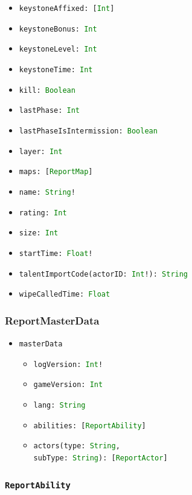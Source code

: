 \documentclass[10pt, a4paper]{memoir}
\numberwithin{equation}{section}
\theoremstyle{plain}
\theoremstyle{defp}
\theoremstyle{dotless}
\theoremstyle{definition}
\theoremstyle{dotless}
\theoremstyle{dotless}
\theoremstyle{defp}
\theoremstyle{defp}
\theoremstyle{be}          %
\theoremstyle{defp}
\newcommand\ttt[1]{\texttt{#1}}
\newcommand\type[1]{\ttt{\textcolor{green}{#1}}}
\begin{document}
\begin{itemize}[noitemsep, topsep=1pt]
\begin{itemize}[itemsep=1pt, topsep=1pt]
\item \ttt{keystoneAffixed: [\type{Int}]}
\item \ttt{keystoneBonus: \type{Int}}
\item \ttt{keystoneLevel: \type{Int}}
\item \ttt{keystoneTime: \type{Int}}
\item \ttt{kill: \type{Boolean}}
\item \ttt{lastPhase: \type{Int}}
\item \ttt{lastPhaseIsIntermission: \type{Boolean}}
\item \ttt{layer: \type{Int}}
\item \ttt{maps: [\type{ReportMap}]}
\item \ttt{name: \type{String}!}
\item \ttt{rating: \type{Int}}
\item \ttt{size: \type{Int}}
\item \ttt{startTime: \type{Float}!}
\item \ttt{talentImportCode(actorID: \type{Int}!): \type{String}}
\item \ttt{wipeCalledTime: \type{Float}}
\end{itemize}
\end{itemize}

\subsubsection{ReportMasterData}\label{sec:ReportMasterData}

\begin{itemize}[noitemsep,topsep=1pt]
\item \ttt{masterData}
\begin{itemize}[itemsep=1pt, topsep=1pt]
\item \ttt{logVersion: \type{Int}!}
\item \ttt{gameVersion: \type{Int}}
\item \ttt{lang: \type{String}}
\item \ttt{abilities: [\type{ReportAbility}]}
\item \ttt{actors(type: \type{String}, \\subType: \type{String}): [\type{ReportActor}]}
\end{itemize}
\end{itemize}

\subsubsection{\ttt{ReportAbility}}\label{sec:ReportAbility}
\end{document}

